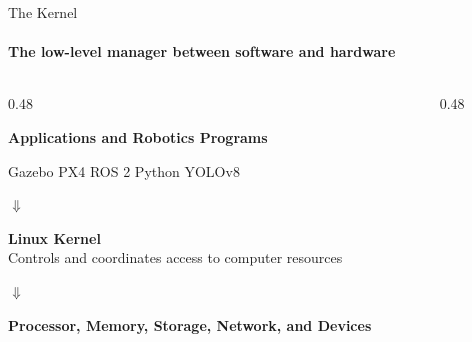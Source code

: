 \begin{frame}{The Kernel}
\framesubtitle{The low-level manager between software and hardware}

\footnotesize

\begin{columns}[T] %

    \begin{column}{0.48\textwidth}
        \begin{center}
            \textbf{Applications and Robotics Programs}
            
            \vspace{0.12cm}
            
            Gazebo \quad PX4 \quad ROS 2 \quad Python \quad YOLOv8
            
            \vspace{0.12cm}
            
            $\Downarrow$
            
            \vspace{0.12cm}
            
            \colorbox{um6p-color-light-blue}{
                \parbox[c][0.95cm][c]{0.9\textwidth}{
                    \centering
                    \textbf{Linux Kernel}\\
                    \scriptsize
                    Controls and coordinates access to computer resources
                }
            }
            
            \vspace{0.12cm}
            
            $\Downarrow$
            
            \vspace{0.12cm}
            
            \textbf{Processor, Memory, Storage, Network, and Devices}
        \end{center}
    \end{column}

    \begin{column}{0.48\textwidth}
        \pause
        

\end{column}
\end{columns}
\end{frame}
